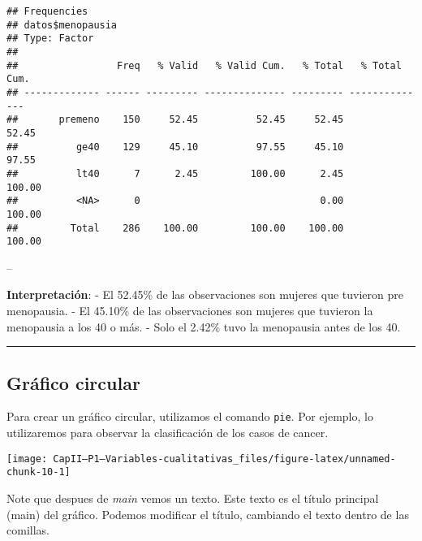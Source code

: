 \documentclass[
]{article}
\newenvironment{Shaded}{\begin{snugshade}}{\end{snugshade}}
\newcommand{\DataTypeTok}[1]{\textcolor[rgb]{0.13,0.29,0.53}{#1}}
\newcommand{\KeywordTok}[1]{\textcolor[rgb]{0.13,0.29,0.53}{\textbf{#1}}}
\newcommand{\NormalTok}[1]{#1}
\newcommand{\OperatorTok}[1]{\textcolor[rgb]{0.81,0.36,0.00}{\textbf{#1}}}
\newcommand{\StringTok}[1]{\textcolor[rgb]{0.31,0.60,0.02}{#1}}
\begin{document}
\begin{verbatim}
## Frequencies  
## datos$menopausia  
## Type: Factor  
## 
##                 Freq   % Valid   % Valid Cum.   % Total   % Total Cum.
## ------------- ------ --------- -------------- --------- --------------
##       premeno    150     52.45          52.45     52.45          52.45
##          ge40    129     45.10          97.55     45.10          97.55
##          lt40      7      2.45         100.00      2.45         100.00
##          <NA>      0                               0.00         100.00
##         Total    286    100.00         100.00    100.00         100.00
\end{verbatim}

--

\textbf{Interpretación}: - El 52.45\% de las observaciones son mujeres
que tuvieron pre menopausia. - El 45.10\% de las observaciones son
mujeres que tuvieron la menopausia a los 40 o más. - Solo el 2.42\% tuvo
la menopausia antes de los 40.

\begin{center}\rule{0.5\linewidth}{0.5pt}\end{center}

\hypertarget{gruxe1fico-circular}{%
\subsection{Gráfico circular}\label{gruxe1fico-circular}}

Para crear un gráfico circular, utilizamos el comando \texttt{pie}. Por
ejemplo, lo utilizaremos para observar la clasificación de los casos de
cancer.

\begin{Shaded}
\end{Shaded}

\begin{center}\texttt{[image: CapII---P1---Variables-cualitativas\_files/figure-latex/unnamed-chunk-10-1]} \end{center}

Note que despues de \emph{main} vemos un texto. Este texto es el título
principal (main) del gráfico. Podemos modificar el título, cambiando el
texto dentro de las comillas.
\end{document}
